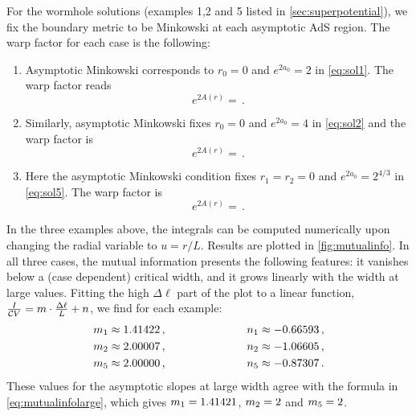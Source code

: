 For the wormhole solutions (examples 1,2 and 5 listed in \cref{sec:superpotential}), we fix the boundary metric to be Minkowski at each asymptotic AdS region.
The warp factor for each case is the following:
\begin{enumerate}
\item 
Asymptotic Minkowski corresponds to $r_0=0$ and $e^{2a_0}=2$ in \cref{eq:sol1}.
The warp factor reads
\begin{equation}
	e^{2A(r)}=\,.
\end{equation}

\item 
Similarly, asymptotic Minkowski fixes $r_0=0$ and $e^{2a_0}=4$ in \cref{eq:sol2} and the warp factor is
\begin{equation}
	e^{2A(r)}=\,.
\end{equation}

\item[5.] 
Here the asymptotic Minkowski condition fixes $r_1=r_2=0$ and $e^{2a_0}=2^{4/3}$ in \cref{eq:sol5}.
The warp factor is
\begin{equation}\label{eq:warp5}
	e^{2A(r)}=\,.
\end{equation}

\end{enumerate}
In the three examples above, the integrals  can be computed numerically upon changing the radial variable to $u=r/L$.
Results are plotted in \cref{fig:mutualinfo}.
In all three cases, the mutual information presents the following features: it vanishes below a (case dependent) critical width, and it grows linearly with the width at large values.
Fitting the high $\Delta\ell$ part of the plot to a linear function, $\frac{I}{\mathcal{C} V}=m\cdot \frac{\Delta \ell}{L} + n$, we find for each example:
\begin{align}
	m_1 &\approx 1.41422\,, \hspace{2.5cm} n_1 \approx -0.66593\,, \\
	m_2 &\approx 2.00007\,, \hspace{2.5cm} n_2 \approx -1.06605\,, \\
	m_5 &\approx 2.00000\,, \hspace{2.5cm} n_5 \approx -0.87307\,.
\end{align}
These values for the asymptotic slopes at large width agree with the formula in \cref{eq:mutualinfolarge}, which gives $m_1=1.41421$, $m_2=2$ and $m_5=2$.

